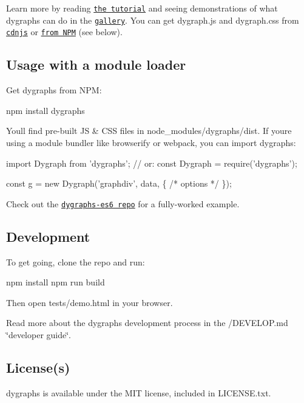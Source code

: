 Learn more by reading \href{http://www.dygraphs.com/tutorial.html}{\tt the tutorial} and seeing demonstrations of what dygraphs can do in the \href{http://www.dygraphs.com/gallery}{\tt gallery}. You can get {\ttfamily dygraph.\+js} and {\ttfamily dygraph.\+css} from \href{https://cdnjs.com/libraries/dygraph}{\tt cdnjs} or \href{https://www.npmjs.com/package/dygraphs}{\tt from N\+PM} (see below).\hypertarget{md_src_nginx_node_modules_dygraphs_README_autotoc_md31}{}\subsection{Usage with a module loader}\label{md_src_nginx_node_modules_dygraphs_README_autotoc_md31}
Get dygraphs from N\+PM\+: \begin{DoxyVerb}npm install dygraphs
\end{DoxyVerb}


You\textquotesingle{}ll find pre-\/built JS \& C\+SS files in {\ttfamily node\+\_\+modules/dygraphs/dist}. If you\textquotesingle{}re using a module bundler like browserify or webpack, you can import dygraphs\+:


\begin{DoxyCode}
import Dygraph from 'dygraphs';
// or: const Dygraph = require('dygraphs');

const g = new Dygraph('graphdiv', data, \{ /* options */ \});
\end{DoxyCode}


Check out the \href{https://github.com/danvk/dygraphs-es6}{\tt dygraphs-\/es6 repo} for a fully-\/worked example.\hypertarget{md_src_nginx_node_modules_dygraphs_README_autotoc_md32}{}\subsection{Development}\label{md_src_nginx_node_modules_dygraphs_README_autotoc_md32}
To get going, clone the repo and run\+: \begin{DoxyVerb}npm install
npm run build
\end{DoxyVerb}


Then open {\ttfamily tests/demo.\+html} in your browser.

Read more about the dygraphs development process in the /\+D\+E\+V\+E\+L\+OP.md \char`\"{}developer guide\char`\"{}.\hypertarget{md_src_nginx_node_modules_dygraphs_README_autotoc_md33}{}\subsection{License(s)}\label{md_src_nginx_node_modules_dygraphs_README_autotoc_md33}
dygraphs is available under the M\+IT license, included in L\+I\+C\+E\+N\+S\+E.\+txt. 